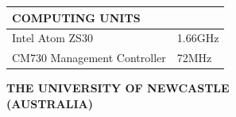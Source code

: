 \documentclass[10pt,a4paper]{article}
\begin{document}
\begin{multicols}{2}
\begin{table}[H]
	\begin{tabular}{|m{5.75cm}|m{1.15cm}|}
		\hline
		\rowcolor[rgb]{0.0, 0.0, 0.0}
		{\color{textcolour}\textbf{{COMPUTING UNITS}}} & \\
		\hline
		Intel Atom ZS30 & 1.66GHz \\
		\hline
		CM730 Management Controller & 72MHz \\
		\hline
	\end{tabular}
\end{table}

\columnbreak

\begin{center}
	\colorbox[rgb]{0.0, 0.0, 0.0}
	{
	\begin{minipage}[c][3.5em][c]{0.45\textwidth}
		\begin{center}
			{\color{textcolour}
				{
				\textbf{THE UNIVERSITY OF NEWCASTLE \\
				(AUSTRALIA)}
				}
			}
		\end{center}
	\end{minipage}
	}
\end{center}


\end{multicols}
\end{document}
